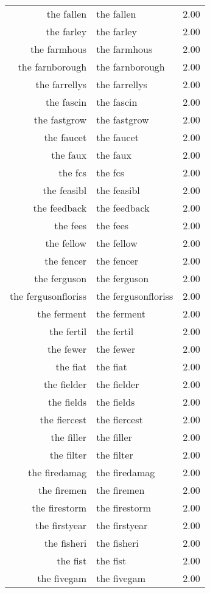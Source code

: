 \begin{table}[ht]
\begin{tabular}{rlr}
  the fallen & the fallen & 2.00 \\ 
  the farley & the farley & 2.00 \\ 
  the farmhous & the farmhous & 2.00 \\ 
  the farnborough & the farnborough & 2.00 \\ 
  the farrellys & the farrellys & 2.00 \\ 
  the fascin & the fascin & 2.00 \\ 
  the fastgrow & the fastgrow & 2.00 \\ 
  the faucet & the faucet & 2.00 \\ 
  the faux & the faux & 2.00 \\ 
  the fcs & the fcs & 2.00 \\ 
  the feasibl & the feasibl & 2.00 \\ 
  the feedback & the feedback & 2.00 \\ 
  the fees & the fees & 2.00 \\ 
  the fellow & the fellow & 2.00 \\ 
  the fencer & the fencer & 2.00 \\ 
  the ferguson & the ferguson & 2.00 \\ 
  the fergusonfloriss & the fergusonfloriss & 2.00 \\ 
  the ferment & the ferment & 2.00 \\ 
  the fertil & the fertil & 2.00 \\ 
  the fewer & the fewer & 2.00 \\ 
  the fiat & the fiat & 2.00 \\ 
  the fielder & the fielder & 2.00 \\ 
  the fields & the fields & 2.00 \\ 
  the fiercest & the fiercest & 2.00 \\ 
  the filler & the filler & 2.00 \\ 
  the filter & the filter & 2.00 \\ 
  the firedamag & the firedamag & 2.00 \\ 
  the firemen & the firemen & 2.00 \\ 
  the firestorm & the firestorm & 2.00 \\ 
  the firstyear & the firstyear & 2.00 \\ 
  the fisheri & the fisheri & 2.00 \\ 
  the fist & the fist & 2.00 \\ 
  the fivegam & the fivegam & 2.00 \\ 

\end{tabular}
\end{table}
